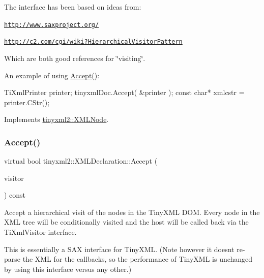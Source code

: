 The interface has been based on ideas from\+:


\begin{DoxyItemize}
\item \href{http://www.saxproject.org/}{\tt http\+://www.\+saxproject.\+org/}
\item \href{http://c2.com/cgi/wiki?HierarchicalVisitorPattern}{\tt http\+://c2.\+com/cgi/wiki?\+Hierarchical\+Visitor\+Pattern}
\end{DoxyItemize}

Which are both good references for \char`\"{}visiting\char`\"{}.

An example of using \hyperlink{classtinyxml2_1_1XMLDeclaration_acf47629d9fc08ed6f1c164a97bcf794b}{Accept()}\+: \begin{DoxyVerb}TiXmlPrinter printer;
tinyxmlDoc.Accept( &printer );
const char* xmlcstr = printer.CStr();
\end{DoxyVerb}
 

Implements \hyperlink{classtinyxml2_1_1XMLNode_a81e66df0a44c67a7af17f3b77a152785}{tinyxml2\+::\+X\+M\+L\+Node}.

\mbox{\label{classtinyxml2_1_1XMLDeclaration_a5f376019fb34752eb248548f42f32045}} 
\subsubsection{\texorpdfstring{Accept()}{Accept()}\hspace{0.1cm}{\footnotesize\ttfamily [2/2]}}
{\footnotesize\ttfamily virtual bool tinyxml2\+::\+X\+M\+L\+Declaration\+::\+Accept (\begin{DoxyParamCaption}\item[{\hyperlink{classtinyxml2_1_1XMLVisitor}{X\+M\+L\+Visitor} $\ast$}]{visitor }\end{DoxyParamCaption}) const\hspace{0.3cm}{\ttfamily [virtual]}}

Accept a hierarchical visit of the nodes in the Tiny\+X\+ML D\+OM. Every node in the X\+ML tree will be conditionally visited and the host will be called back via the Ti\+Xml\+Visitor interface.

This is essentially a S\+AX interface for Tiny\+X\+ML. (Note however it doesn\textquotesingle{}t re-\/parse the X\+ML for the callbacks, so the performance of Tiny\+X\+ML is unchanged by using this interface versus any other.)

